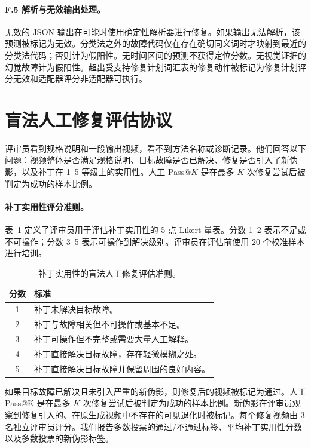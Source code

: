 \documentclass{article}
\begin{document}
\paragraph{F.5 解析与无效输出处理。}
无效的 JSON 输出在可能时使用确定性解析器进行修复。如果输出无法解析，该预测被标记为无效。分类法之外的故障代码仅在存在确切同义词时才映射到最近的分类法代码；否则计为假阳性。无时间区间的预测不获得定位分数。无视觉证据的幻觉故障计为假阳性。超出受支持修复计划词汇表的修复动作被标记为修复计划评分无效和适配器评分非适配器可执行。

\section{盲法人工修复评估协议}
\label{app:human_repair}
评审员看到规格说明和一段输出视频，看不到方法名称或诊断记录。他们回答以下问题：视频整体是否满足规格说明、目标故障是否已解决、修复是否引入了新伪影，以及补丁在 1--5 等级上的实用性。人工 Pass@$K$ 是在最多 $K$ 次修复尝试后被判定为成功的样本比例。

\begin{table}[t]
\centering
\caption{补丁实用性的盲法人工修复评估准则。}
\paragraph{补丁实用性评分准则。}
表~\ref{tab:human_rubric} 定义了评审员用于评估补丁实用性的 5 点 Likert 量表。分数 1--2 表示不足或不可操作；分数 3--5 表示可操作到解决级别。评审员在评估前使用 20 个校准样本进行培训。

\label{tab:human_rubric}
\begin{tabular}{cl}
\toprule
分数 & 标准 \\
\midrule
1 & 补丁未解决目标故障。 \\
2 & 补丁与故障相关但不可操作或基本不足。 \\
3 & 补丁可操作但不完整或需要大量人工解释。 \\
4 & 补丁直接解决目标故障，存在轻微模糊之处。 \\
5 & 补丁直接解决目标故障并保留周围的良好内容。 \\
\bottomrule
\end{tabular}
\end{table}

如果目标故障已解决且未引入严重的新伪影，则修复后的视频被标记为通过。人工 Pass@K 是在最多 $K$ 次修复尝试后被判定为成功的样本比例。新伪影在评审员观察到修复引入的、在原生成视频中不存在的可见退化时被标记。每个修复视频由 3 名独立评审员评分。我们报告多数投票的通过/不通过标签、平均补丁实用性分数以及多数投票的新伪影标签。
\end{document}
